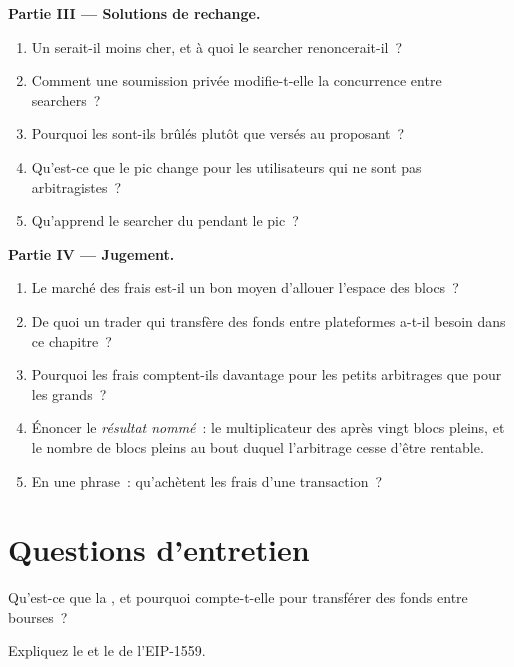 \begin{problem}
\medskip\noindent\textbf{Partie III --- Solutions de rechange.}
\begin{enumerate}[resume]
\item Un  serait-il moins cher, et à quoi le searcher renoncerait-il~?
\item Comment une soumission privée modifie-t-elle la concurrence entre searchers~?
\item Pourquoi les  sont-ils brûlés plutôt que versés au proposant~?
\item Qu'est-ce que le pic change pour les utilisateurs qui ne sont pas arbitragistes~?
\item Qu'apprend le searcher du  pendant le pic~?
\end{enumerate}

\medskip\noindent\textbf{Partie IV --- Jugement.}
\begin{enumerate}[resume]
\item Le marché des frais est-il un bon moyen d'allouer l'espace des blocs~?
\item De quoi un trader qui transfère des fonds entre plateformes a-t-il besoin dans ce chapitre~?
\item Pourquoi les frais comptent-ils davantage pour les petits arbitrages que pour les grands~?
\item Énoncer le \emph{résultat nommé}~: le multiplicateur des  après vingt blocs pleins, et le nombre de blocs pleins
au bout duquel l'arbitrage cesse d'être rentable.
\item En une phrase~: qu'achètent les frais d'une transaction~?
\end{enumerate}
\end{problem}

\section{Questions d'entretien}

\begin{interviewq}\label{iq:m3:blockchains-for-traders:1}
Qu'est-ce que la , et pourquoi compte-t-elle pour transférer des fonds entre bourses~?
\end{interviewq}

\begin{interviewq}\label{iq:m3:blockchains-for-traders:2}
Expliquez le  et le  de l'EIP-1559.
\end{interviewq}

